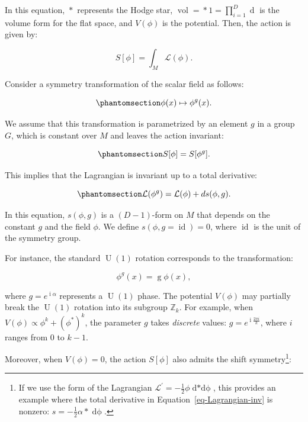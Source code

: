 \documentclass[
  letterpaper,
  DIV=11,
  numbers=noendperiod]{scrreport}
\DeclareMathOperator{\vol}{vol}
\DeclareMathOperator{\U}{U}
\DeclareMathOperator{\imunit}{i}
\DeclareMathOperator{\id}{id}
\newcommand{\stdim}{D}
\begin{document}
In this equation, \(\mathop{*}\) represents the Hodge star,
\(\vol = \mathop{*} 1 = \prod_{i=1}^{\stdim} \mathop{dx_i}\) is the
volume form for the flat space, and \(V(\phi)\) is the potential. Then,
the action is given by:

\[
S[\phi] = \int_{M}\mathcal{L}(\phi).
\]

Consider a symmetry transformation of the scalar field as follows:

\begin{equation}\phantomsection\label{eq-scalar-transf}{
\phi(x) \mapsto \phi^g(x).
}\end{equation}

We assume that this transformation is parametrized by an element \(g\)
in a group \(G\), which is constant over \(M\) and leaves the action
invariant:

\begin{equation}\phantomsection\label{eq-action-inv}{
S[\phi]=S[\phi^g].
}\end{equation}

This implies that the Lagrangian is invariant up to a total derivative:

\begin{equation}\phantomsection\label{eq-Lagrangian-inv}{
\mathcal{L}(\phi^g) = \mathcal{L}(\phi) + \mathop{ds}(\phi,g).
}\end{equation}

In this equation, \(s(\phi,g)\) is a \((\stdim-1)\)-form on \(M\) that
depends on the constant \(g\) and the field \(\phi\). We define
\(s(\phi,g=\id) = 0\), where \(\id\) is the unit of the symmetry group.

For instance, the standard \(\U(1)\) rotation corresponds to the
transformation:

\[
\phi^g(x) = \mathop{g} \phi(x),
\]

where \(g=e^{\imunit \alpha}\) represents a \(\U(1)\) phase. The
potential \(V(\phi)\) may partially break the \(\U(1)\) rotation into
its subgroup \(\mathbb{Z}_k\). For example, when
\(V(\phi)\propto \phi^k+(\phi^*)^k\), the parameter \(g\) takes
\emph{discrete} values: \(g = e^{\imunit \frac{2\pi i}{k}}\), where
\(i\) ranges from 0 to \(k-1\).

Moreover, when \(V(\phi)=0\), the action \(S[\phi]\) also admits the
shift symmetry\footnote{If we use the form of the Lagrangian
  \(\mathcal{L}^\prime= -\frac12 \phi \mathop{d*d\phi}\), this provides
  an example where the total derivative in
  Equation~\ref{eq-Lagrangian-inv} is nonzero:
  \(s=-\frac12 \alpha \mathop{*}\mathop{d\phi}\).}:
\end{document}

